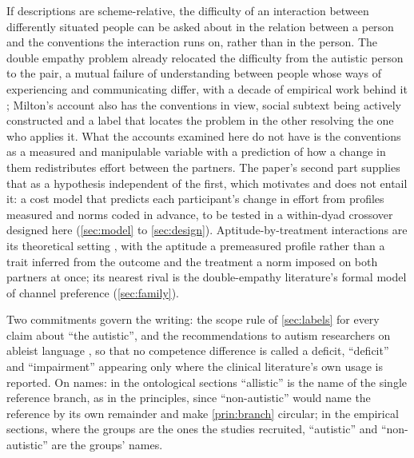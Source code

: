 If descriptions are scheme-relative, the difficulty of an interaction between differently situated people can be asked about in the relation between a person and the conventions the interaction runs on, rather than in the person. The double empathy problem \cite{Milton2012} already relocated the difficulty from the autistic person to the pair, a mutual failure of understanding between people whose ways of experiencing and communicating differ, with a decade of empirical work behind it \cite{Milton2022, DavisCrompton2021, Pellicano2022}; Milton's account also has the conventions in view, social subtext being actively constructed and a label that locates the problem in the other resolving the one who applies it. What the accounts examined here do not have is the conventions as a measured and manipulable variable with a prediction of how a change in them redistributes effort between the partners. The paper's second part supplies that as a hypothesis independent of the first, which motivates and does not entail it: a cost model that predicts each participant's change in effort from profiles measured and norms coded in advance, to be tested in a within-dyad crossover designed here (\autoref{sec:model} to \autoref{sec:design}). Aptitude-by-treatment interactions are its theoretical setting \cite{Cronbach1957, CronbachSnow1977}, with the aptitude a premeasured profile rather than a trait inferred from the outcome and the treatment a norm imposed on both partners at once; its nearest rival is the double-empathy literature's formal model of channel preference \cite{Calderoli2026} (\autoref{sec:family}).

Two commitments govern the writing: the scope rule of \autoref{sec:labels} for every claim about ``the autistic'', and the recommendations to autism researchers on ableist language \cite{BottemaBeutel2021}, so that no competence difference is called a deficit, ``deficit'' and ``impairment'' appearing only where the clinical literature's own usage is reported. On names: in the ontological sections ``allistic'' is the name of the single reference branch, as in the principles, since ``non-autistic'' would name the reference by its own remainder and make \autoref{prin:branch} circular; in the empirical sections, where the groups are the ones the studies recruited, ``autistic'' and ``non-autistic'' are the groups' names.

